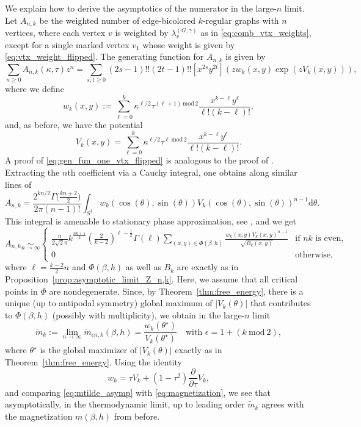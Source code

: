 \documentclass{article}
\numberwithin{theorem}{section}
\theoremstyle{remark}
\begin{document}
We explain how to derive the asymptotics of the numerator in the large-$n$ limit. 
Let $A_{n,k}$ be the weighted number of edge-bicolored $k$-regular graphs with $n$ vertices, where each vertex $v$ is weighted by $\lambda_{v}^{(G,\gamma)}$ as in \eqref{eq:comb_vtx_weights}, except for a single marked vertex $v_1$ whose weight is given by \eqref{eq:vtx_weight_flipped}.
The generating function for $A_{n,k}$ is given by
\begin{equation}
  \label{eq:gen_fun_one_vtx_flipped}
  \sum_{n\geq 0}A_{n,k}(\kappa,\tau)z^n =  \sum_{s,t \geq 0} (2s-1)!! (2t-1)!! [x^{2s} y^{2t}] \left( z w_k(x,y) \exp(z V_k(x,y)) \right),
\end{equation}
where we define
\[
  w_k(x,y) := \sum_{\ell=0}^k \kappa^{\ell/2} \tau^{(\ell+1)\,\mathrm{mod}\, 2} \frac{x^{k-\ell}y^\ell}{\ell!(k-\ell)!},
\]
and, as before, we have the potential
\[
  V_k(x,y) =  \sum_{\ell=0}^k \kappa^{\ell/2} \tau^{\ell~\mathrm{mod}\, 2} \frac{x^{k-\ell}y^\ell}{\ell!(k-\ell)!}.
\]
A proof of \eqref{eq:gen_fun_one_vtx_flipped} is analogous to the proof of \cite[Proposition 3.5]{BMW_bicolored}. Extracting the $n$th coefficient via a Cauchy integral, one obtains along similar lines of \cite[Lemma 3.1]{BMW_multicolor}
\[
  A_{n,k} = \frac{2^{kn/2} \Gamma\big(\frac{kn+2}{2}\big)}{2\pi (n-1)!} \int_{S^1} w_k(\cos(\theta),\sin(\theta)) V_k(\cos(\theta),\sin(\theta))^{n-1} \mathrm{d}{\theta}.
\]
This integral is amenable to stationary phase approximation, see \cite[\S 5]{deBruijnAsymptotic}, and we get
\[
  A_{n,k} \underset{n\to\infty}{\sim} \left\{\begin{array}{ll}
    \frac{n}{2\sqrt{2}\pi} k^{\frac{nk+ 1}{2}} \left( \frac{2}{k-2} \right)^{\ell-\frac{1}{2}} \Gamma(\ell) \sum_{(x,y) \in \Phi(\beta,h)} \frac{w_k(x,y) V_k(x,y)^{n-1}}{\sqrt{B_k(x,y)}} & \text{if } nk \text{ is even}, \\
    0 & \text{otherwise},
  \end{array}\right. 
\]
where $\ell = \frac{k-2}{2}n$ and $\Phi(\beta, h)$ as well as $B_k$ are exactly as in Proposition~\ref{prop:asymptotic_limit_Z_n,k}. Here, we assume that all critical points in $\Phi$ are nondegenerate. Since, by Theorem~\ref{thm:free_energy}, there is a unique (up to antipodal symmetry) global maximum of $|V_k(\theta)|$ that contributes to $\Phi(\beta,h)$ (possibly with multiplicity), we obtain in the large-$n$ limit
\begin{equation}
  \label{eq:mtilde_asymp}
  \widetilde{m}_k := \lim_{n\to\infty} \widetilde{m}_{\epsilon n,k}(\beta, h) = \frac{w_k(\theta^\star)}{V_k(\theta^\star)} \quad \text{with } \epsilon = 1 + (k ~\mathrm{mod}~ 2),
\end{equation}
where $\theta^\star$ is the global maximizer of $|V_k(\theta)|$ exactly as in Theorem~\ref{thm:free_energy}. Using the identity
\[
  w_k = \tau V_k + (1-\tau^2) \frac{\partial}{\partial \tau} V_k,
\]
and comparing \eqref{eq:mtilde_asymp} with \eqref{eq:magnetization}, we see that asymptotically, in the thermodynamic limit, up to leading order $\widetilde{m}_k$ agrees with the magnetization $m(\beta,h)$ from before.
\end{document}
